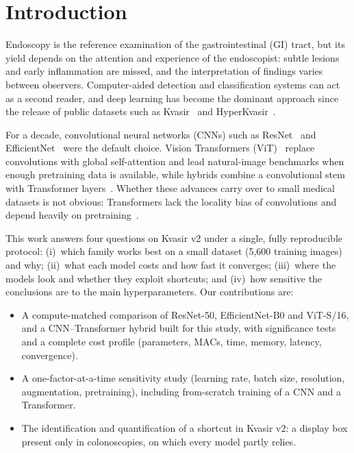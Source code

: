 \documentclass[conference]{IEEEtran}
\begin{document}
\section{Introduction}
Endoscopy is the reference examination of the gastrointestinal (GI) tract, but its yield depends on the attention and
experience of the endoscopist: subtle lesions and early inflammation are missed, and the interpretation of findings
varies between observers. Computer-aided detection and classification systems can act as a second reader, and deep
learning has become the dominant approach since the release of public datasets such as Kvasir~\cite{pogorelov2017kvasir}
and HyperKvasir~\cite{borgli2020hyperkvasir}.

For a decade, convolutional neural networks (CNNs) such as ResNet~\cite{he2016resnet} and
EfficientNet~\cite{tan2019efficientnet} were the default choice. Vision Transformers (ViT)~\cite{dosovitskiy2021vit}
replace convolutions with global self-attention and lead natural-image benchmarks when enough pretraining data is
available, while hybrids combine a convolutional stem with Transformer layers~\cite{dosovitskiy2021vit,chen2021transunet,dai2021coatnet}.
Whether these advances carry over to small medical datasets is not obvious: Transformers lack the locality bias of
convolutions and depend heavily on pretraining~\cite{steiner2022augreg,matsoukas2021time}.

This work answers four questions on Kvasir v2 under a single, fully reproducible protocol: (i)~which family works best
on a small dataset (5{,}600 training images) and why; (ii)~what each model costs and how fast it converges; (iii)~where
the models look and whether they exploit shortcuts; and (iv)~how sensitive the conclusions are to the main
hyperparameters. Our contributions are:
\begin{itemize}
\item A compute-matched comparison of ResNet-50, EfficientNet-B0 and ViT-S/16, and a CNN--Transformer hybrid built for
this study, with significance tests and a complete cost profile (parameters, MACs, time, memory, latency, convergence).
\item A one-factor-at-a-time sensitivity study (learning rate, batch size, resolution, augmentation, pretraining),
including from-scratch training of a CNN and a Transformer.
\item The identification and quantification of a shortcut in Kvasir v2: a display box present only in colonoscopies,
on which every model partly relies.
\end{itemize}
\end{document}
